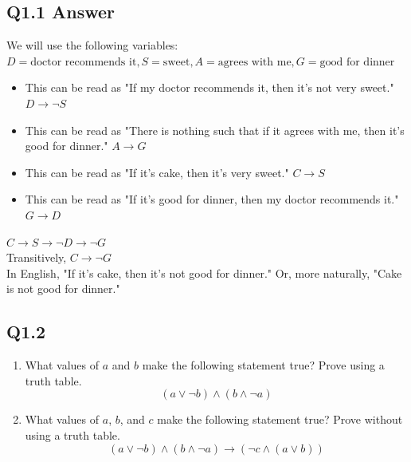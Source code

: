 \documentclass{article}
\begin{document}
\subsection*{Q1.1 Answer}
We will use the following variables: $D=\text{doctor recommends it},S=\text{sweet},A=\text{agrees with me},G=\text{good for dinner}$
\begin{itemize}
    \item This can be read as "If my doctor recommends it, then it's not very sweet." $D\rightarrow \neg S$
    \item This can be read as "There is nothing such that if it agrees with me, then it's good for dinner." $A\rightarrow G$
    \item This can be read as "If it's cake, then it's very sweet." $C\rightarrow S$
    \item This can be read as "If it's good for dinner, then my doctor recommends it." $G\rightarrow D$
\end{itemize}
$C\rightarrow S\rightarrow \neg D\rightarrow\neg G$
\\ Transitively, $C\rightarrow\neg G$
\\ In English, "If it's cake, then it's not good for dinner." Or, more naturally, "Cake is not good for dinner."
\newpage
{}
\subsection*{Q1.2}
\begin{enumerate}[label=\alph*.]
    \item What values of $a$ and $b$ make the following statement true? Prove using a truth table.
    $$(a \lor \neg b) \land (b \land \neg a)$$
    \item What values of $a$, $b$, and $c$ make the following statement true? Prove without using a truth table.
    $$(a \lor \neg b) \land (b \land \neg a)\rightarrow (\neg c\land(a \lor b))$$
\end{enumerate}
\newpage
\end{document}
